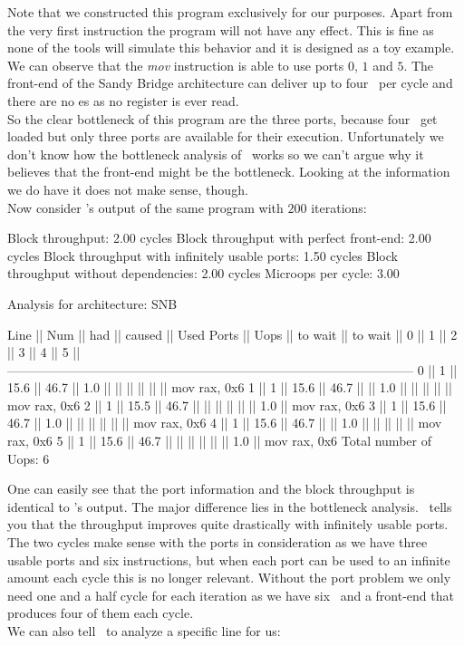 Note that we constructed this program exclusively for our purposes. Apart from the very first instruction the program will not have any effect. This is fine as none of the tools will simulate this behavior and it is designed as a toy example.\\
We can observe that the \emph{mov} instruction is able to use ports $0$, $1$ and $5$. The front-end of the Sandy Bridge architecture can deliver up to four \microops\ per cycle and there are no es as no register is ever read.\\
So the clear bottleneck of this program are the three ports, because four \microops\ get loaded but only three ports are available for their execution. Unfortunately we don't know how the bottleneck analysis of \iaca\ works so we can't argue why it believes that the front-end might be the bottleneck. Looking at the information we do have it does not make sense, though.\\


Now consider \suaca's output of the same program with $200$ iterations:

\begin{example}
Block throughput: 2.00 cycles
Block throughput with perfect front-end: 2.00 cycles
Block throughput with infinitely usable ports: 1.50 cycles
Block throughput without dependencies: 2.00 cycles
Microops per cycle: 3.00
       
Analysis for architecture: SNB
        
 Line  ||   Num   ||   had   || caused  ||            Used Ports
       ||   Uops  || to wait || to wait ||   0   ||   1   ||   2   ||   3   ||   4   ||   5   ||
 ------------------------------------------------------------------------------------------------
   0   ||    1    ||  15.6   ||  46.7   ||  1.0  ||       ||       ||       ||       ||       || mov rax, 0x6
   1   ||    1    ||  15.6   ||  46.7   ||       ||  1.0  ||       ||       ||       ||       || mov rax, 0x6
   2   ||    1    ||  15.5   ||  46.7   ||       ||       ||       ||       ||       ||  1.0  || mov rax, 0x6
   3   ||    1    ||  15.6   ||  46.7   ||  1.0  ||       ||       ||       ||       ||       || mov rax, 0x6
   4   ||    1    ||  15.6   ||  46.7   ||       ||  1.0  ||       ||       ||       ||       || mov rax, 0x6
   5   ||    1    ||  15.6   ||  46.7   ||       ||       ||       ||       ||       ||  1.0  || mov rax, 0x6
Total number of Uops: 6
\end{example}

One can easily see that the port information and the block throughput is identical to \iaca's output. The major difference lies in the bottleneck analysis. \suaca\ tells you that the throughput improves quite drastically with infinitely usable ports. The two cycles make sense with the ports in consideration as we have three usable ports and six instructions, but when each port can be used to an infinite amount each cycle this is no longer relevant. Without the port problem we only need one and a half cycle for each iteration as we have six \microops\ and a front-end that produces four of them each cycle.\\
We can also tell \suaca\ to analyze a specific line for us:

